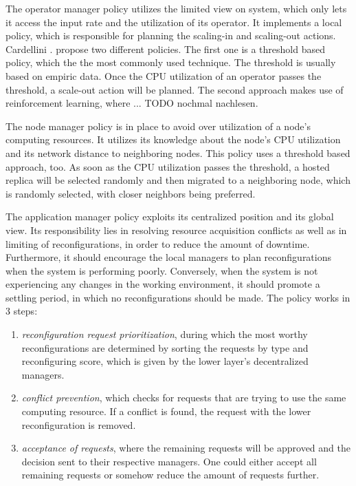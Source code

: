         \quad The operator manager policy utilizes the limited view on system, which only lets it access the input rate and the utilization of its operator.
        It implements a local policy, which is responsible for planning the scaling-in and scaling-out actions. Cardellini . propose two different policies.
        The first one is a threshold based policy, which the the most commonly used technique. The threshold is usually based on empiric data. Once the CPU utilization 
        of an operator passes the threshold, a scale-out action will be planned. 
        The second approach makes use of reinforcement learning, where ... {TODO nochmal nachlesen}.

        \quad The node manager policy is in place to avoid over utilization of a node's computing resources. 
        It utilizes its knowledge about the node's CPU utilization and its network distance to neighboring nodes.
        This policy uses a threshold based approach, too. As soon as the CPU utilization passes the threshold, a hosted replica will be selected 
        randomly and then migrated to a neighboring node, which is randomly selected, with closer neighbors being preferred. 

        \quad The application manager policy exploits its centralized position and its global view. 
        Its responsibility lies in resolving resource acquisition conflicts as well as in limiting of reconfigurations, 
        in order to reduce the amount of downtime. Furthermore, it should encourage the local managers to plan reconfigurations when the system 
        is performing poorly. Conversely, when the system is not experiencing any changes in the working environment, it should promote a settling period, 
        in which no reconfigurations should be made.
        The policy works in 3 steps:

        \begin{enumerate}
            \item \textit{reconfiguration request prioritization}, during which the most worthy reconfigurations are determined by sorting the requests 
            by type and reconfiguring score, which is given by the lower layer's decentralized managers. 
            \item \textit{conflict prevention}, which checks for requests that are trying to use the same computing resource. If a conflict is found, the 
            request with the lower reconfiguration is removed.
            \item \textit{acceptance of requests}, where the remaining requests will be approved and the decision sent to their respective managers. 
            One could either accept all remaining requests or somehow reduce the amount of requests further.
        \end{enumerate}



